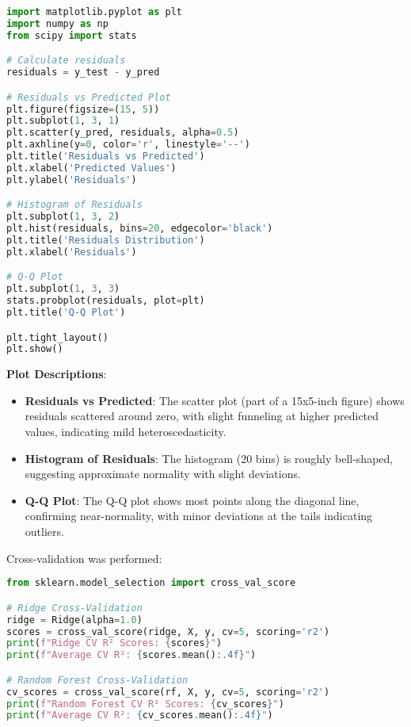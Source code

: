 \documentclass[12pt]{article}
\begin{document}
\begin{lstlisting}[language=Python, caption=Residual Analysis Code]
import matplotlib.pyplot as plt
import numpy as np
from scipy import stats

# Calculate residuals
residuals = y_test - y_pred

# Residuals vs Predicted Plot
plt.figure(figsize=(15, 5))
plt.subplot(1, 3, 1)
plt.scatter(y_pred, residuals, alpha=0.5)
plt.axhline(y=0, color='r', linestyle='--')
plt.title('Residuals vs Predicted')
plt.xlabel('Predicted Values')
plt.ylabel('Residuals')

# Histogram of Residuals
plt.subplot(1, 3, 2)
plt.hist(residuals, bins=20, edgecolor='black')
plt.title('Residuals Distribution')
plt.xlabel('Residuals')

# Q-Q Plot
plt.subplot(1, 3, 3)
stats.probplot(residuals, plot=plt)
plt.title('Q-Q Plot')

plt.tight_layout()
plt.show()
\end{lstlisting}

\textbf{Plot Descriptions}:
\begin{itemize}
    \item \textbf{Residuals vs Predicted}: The scatter plot (part of a 15x5-inch figure) shows residuals scattered around zero, with slight funneling at higher predicted values, indicating mild heteroscedasticity.
    \item \textbf{Histogram of Residuals}: The histogram (20 bins) is roughly bell-shaped, suggesting approximate normality with slight deviations.
    \item \textbf{Q-Q Plot}: The Q-Q plot shows most points along the diagonal line, confirming near-normality, with minor deviations at the tails indicating outliers.
\end{itemize}

Cross-validation was performed:

\begin{lstlisting}[language=Python, caption=Cross-Validation Code]
from sklearn.model_selection import cross_val_score

# Ridge Cross-Validation
ridge = Ridge(alpha=1.0)
scores = cross_val_score(ridge, X, y, cv=5, scoring='r2')
print(f"Ridge CV R² Scores: {scores}")
print(f"Average CV R²: {scores.mean():.4f}")

# Random Forest Cross-Validation
cv_scores = cross_val_score(rf, X, y, cv=5, scoring='r2')
print(f"Random Forest CV R² Scores: {cv_scores}")
print(f"Average CV R²: {cv_scores.mean():.4f}")
\end{lstlisting}
\end{document}
